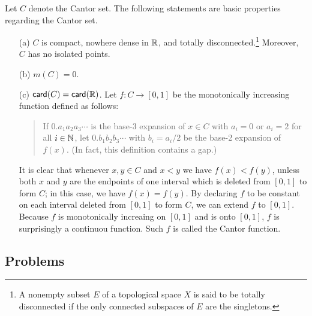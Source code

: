 \begin{exmp}
    Let $C$ denote the Cantor set.
    The following statements are basic properties regarding the Cantor set.
    \begin{enumerate}
        \item[(a)]
        {
            $C$ is compact, nowhere dense in ${\mathbb{R}}$, and totally disconnected.\footnote{A nonempty subset $E$ of a topological space $X$ is said to be totally disconnected if the only connected subspaces of $E$ are the singletons.}
            Moreover, $C$ has no isolated points.
        }
        \item[(b)]
        {
            $m(C)=0$.
        }
        \item[(c)]
        {
            $\textsf{card}({C})=\textsf{card}({{\mathbb{R}}})$.
        }
        Let $f: C\rightarrow[0, 1]$ be the monotonically increasing function defined as follows:
        \begin{quotation}
            If $0.a_1a_2a_3\cdots$ is the base-3 expansion of $x\in C$ with $a_i=0$ or $a_i=2$ for all $i\in{\mathbb{N}}$, let $0.b_1b_2b_3\cdots$ with $b_i={a_i}/{2}$ be the base-2 expansion of $f(x)$.
            (In fact, this definition contains a gap.)
        \end{quotation}
        It is clear that whenever $x, y\in C$ and $x<y$ we have $f(x)<f(y)$, unless both $x$ and $y$ are the endpoints of one interval which is deleted from $[0, 1]$ to form $C$; in this case, we have $f(x)=f(y)$.
        By declaring $f$ to be constant on each interval deleted from $[0, 1]$ to form $C$, we can extend $f$ to $[0, 1]$.
        Because $f$ is monotonically increaing on $[0, 1]$ and is onto $[0, 1]$, $f$ is surprisingly a continuou function.
        Such $f$ is called the Cantor function.
    \end{enumerate}
\end{exmp}

\subsection*{Problems}

